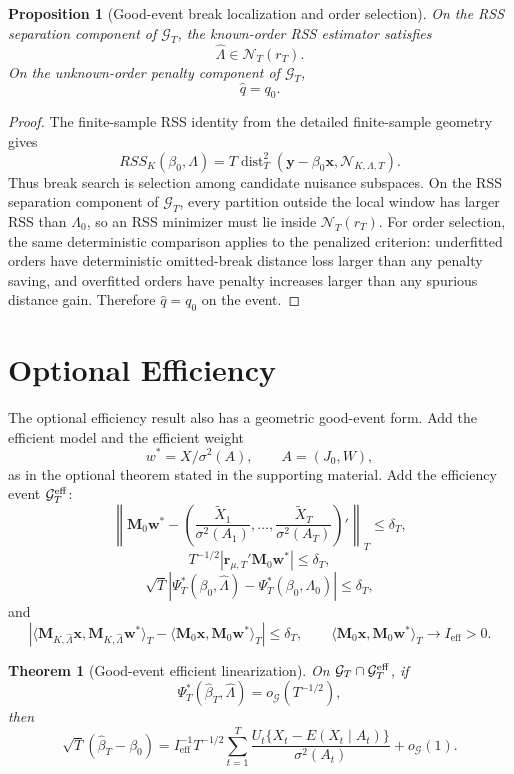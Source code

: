 \documentclass[12pt]{article}
\numberwithin{equation}{section}
\newtheorem{theorem}{Theorem}
\newtheorem{proposition}{Proposition}
\theoremstyle{definition}
\newcommand{\N}{\mathcal N}
\newcommand{\innerT}[2]{\langle #1,#2\rangle_T}
\begin{document}
\begin{proposition}[Good-event break localization and order selection]
\label{prop:v2-good-event-rss-selection}
On the RSS separation component of \(\mathcal G_T\), the known-order RSS
estimator satisfies
\[
    \widehat\Lambda\in\mathcal N_T(r_T).
\]
On the unknown-order penalty component of \(\mathcal G_T\),
\[
    \widehat q=q_0.
\]
\end{proposition}

\begin{proof}
The finite-sample RSS identity from the detailed finite-sample geometry gives
\[
    RSS_K(\beta_0,\Lambda)
    =T\operatorname{dist}_T^2(\bm y-\beta_0\bm x,
      \N_{K,\Lambda,T}).
\]
Thus break search is selection among candidate nuisance subspaces. On the RSS
separation component of \(\mathcal G_T\), every partition outside the local
window has larger RSS than \(\Lambda_0\), so an RSS minimizer must lie inside
\(\mathcal N_T(r_T)\). For order selection, the same deterministic comparison
applies to the penalized criterion: underfitted orders have deterministic
omitted-break distance loss larger than any penalty saving, and overfitted
orders have penalty increases larger than any spurious distance gain. Therefore
\(\widehat q=q_0\) on the event.
\end{proof}

\section{Optional Efficiency}

The optional efficiency result also has a geometric good-event form. Add the
efficient model and the efficient weight
\[
    w^*=X/\sigma^2(A),
    \qquad A=(J_0,W),
\]
as in the optional theorem stated in the supporting material. Add the efficiency event \(\mathcal G_T^{\rm eff}\):
\[
    \left\|\bm M_0\bm w^*-
    \left(\frac{\widetilde X_1}{\sigma^2(A_1)},\ldots,
          \frac{\widetilde X_T}{\sigma^2(A_T)}\right)'\right\|_T
    \le\delta_T,
\]
\[
    T^{-1/2}|\bm r_{\mu,T}'\bm M_0\bm w^*|\le\delta_T,
\]
\[
    \sqrt T|\Psi_T^*(\beta_0,\widehat\Lambda)
      -\Psi_T^*(\beta_0,\Lambda_0)|\le\delta_T,
\]
and
\[
    \left|\innerT{\bm M_{K,\widehat\Lambda}\bm x}
      {\bm M_{K,\widehat\Lambda}\bm w^*}
      -\innerT{\bm M_0\bm x}{\bm M_0\bm w^*}\right|\le\delta_T,
    \qquad
    \innerT{\bm M_0\bm x}{\bm M_0\bm w^*}\to I_{\mathrm{eff}}>0.
\]

\begin{theorem}[Good-event efficient linearization]
\label{thm:v2-good-event-efficiency}
On \(\mathcal G_T\cap\mathcal G_T^{\rm eff}\), if
\[
    \Psi_T^*(\widehat\beta_T,\widehat\Lambda)=o_{\mathcal G}(T^{-1/2}),
\]
then
\[
    \sqrt T(\widehat\beta_T-\beta_0)
    =I_{\mathrm{eff}}^{-1}
      T^{-1/2}\sum_{t=1}^T
      \frac{U_t\{X_t-E(X_t\mid A_t)\}}{\sigma^2(A_t)}
      +o_{\mathcal G}(1).
\]
\end{theorem}
\end{document}
